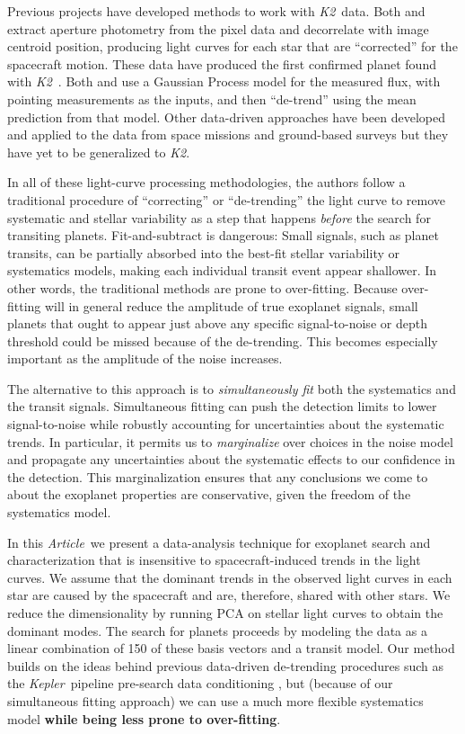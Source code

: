 \documentclass[12pt,preprint]{aastex}
\newcommand{\project}[1]{\textsl{#1}} %
\newcommand{\kepler}{\project{Kepler}}
\newcommand{\KT}{\project{K2}}
\newcommand{\pdc}{\project{PDC}}
\newcommand{\paper}{\textsl{Article}}
\newcommand{\response}[1]{{\color{mygreen} {\bf #1}}}
\begin{document}
Previous projects have developed methods to work with \KT\ data.
Both \citet{Vanderburg:2014} and \citet{Armstrong:2014}
extract aperture photometry from the pixel data
and decorrelate with image centroid position, producing light curves for each
star that are ``corrected'' for the spacecraft motion.
These data have produced the first confirmed planet found with
\KT\ \citep{Vanderburg:2015}.
Both \citet{Aigrain:2015} and \citet{Crossfield:2015} use a Gaussian Process
model for the measured flux, with pointing measurements as the inputs, and
then ``de-trend'' using the mean prediction from that model.
Other data-driven approaches have been developed and applied to the data from
space missions \citep[for example,][]{Ofir:2010, Stumpe:2012, Smith:2012,
Petigura:2013, Wang:2015} and ground-based surveys \citep[for
example,][]{Kovacs:2005, Tamuz:2005, Berta:2012} but they have yet to be
generalized to \KT.

In all of these light-curve processing methodologies, the authors follow a
traditional procedure of ``correcting'' or ``de-trending'' the light curve to
remove systematic and stellar variability as a step that happens \emph{before}
the search for transiting planets.
Fit-and-subtract is dangerous:
Small signals, such as planet transits, can be
partially absorbed into the best-fit stellar variability or systematics
models, making each individual transit event appear shallower.
In other words, the traditional methods are prone to over-fitting.
Because over-fitting will in general reduce the amplitude of true exoplanet
signals, small planets that ought to appear just above any specific
signal-to-noise or depth threshold could be missed because of the de-trending.
This becomes especially important as the amplitude of the noise increases.

The alternative to this approach is to \emph{simultaneously fit} both the
systematics and the transit signals.
Simultaneous fitting can push the detection limits to lower signal-to-noise
while robustly accounting for uncertainties about the systematic trends.
In particular, it permits us to \emph{marginalize} over choices in the noise
model and propagate any uncertainties about the systematic effects
to our confidence in the detection.
This marginalization ensures that any conclusions we come to about the
exoplanet properties are conservative, given the freedom of the systematics
model.

In this \paper\ we present a data-analysis technique for exoplanet search and
characterization that is insensitive to spacecraft-induced trends in the light
curves.
We assume that the dominant trends in the observed light curves in each star
are caused by the spacecraft and are, therefore, shared with other stars.
We reduce the dimensionality by running PCA on stellar light curves to obtain
the dominant modes.
The search for planets proceeds by modeling the data as a linear combination
of 150 of these basis vectors and a transit model.
Our method builds on the ideas behind previous data-driven de-trending
procedures such as the \kepler\ pipeline pre-search data conditioning
\citep[\pdc;][]{Stumpe:2012, Smith:2012}, but (because of our simultaneous
fitting approach) we can use a much more flexible systematics model
\response{while being less prone to over-fitting}.
\end{document}
